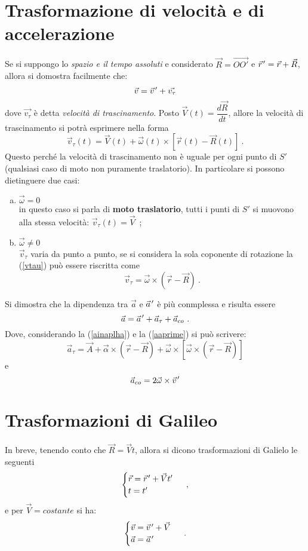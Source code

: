 \documentclass[12pt, oneside]{book}
\newcommand{\pvec}[1]{\vec{#1}\mkern2mu\vphantom{#1}}
\begin{document}
\section{Trasformazione di velocità e di accelerazione}
Se si suppongo lo \emph{spazio e il tempo assoluti} e considerato $\vec{R}=\overrightarrow{OO'}$ e $\pvec{r}'=\vec{r}+\vec{R}$, allora si domostra facilmente che:
\[\vec{v}=\pvec{v}'+\vec{v_\tau}\]
dove $\vec{v_\tau}$ è detta \emph{velocità di trascinamento}.
Posto $\vec{V}(t)=\dfrac{d\vec{R}}{dt}$, allore la velocità di trascinamento si potrà esprimere nella forma
\begin{equation}
\label{vtau}
\vec{v}_\tau(t)=\vec{V}(t)+\vec{\omega}(t)\times[\vec{r}(t)-\vec{R}(t)]~.
\end{equation}
Questo perché la velocità di trascinamento non è uguale per ogni punto di $S'$ (qualsiasi caso di moto non puramente traslatorio). In particolare si possono dietinguere due casi:
\begin{enumerate}[a)]
	\item $\vec{\omega}=0$\\
	in questo caso si parla di \textbf{moto traslatorio}, tutti i punti di $S'$ si muovono alla stessa velocità: $\vec{v}_\tau(t)=\vec{V}$~;
	\item $\vec{\omega}\neq 0$\\
	$\vec{v}_\tau$ varia da punto a punto, se si considera la sola coponente di rotazione la (\ref{vtau}) può essere riscritta come
	\[\vec{v}_\tau=\vec{\omega}\times(\vec{r}-\vec{R})~.\]
\end{enumerate}
Si dimostra che la dipendenza tra $\vec{a}$ e $\pvec{a}'$ è più conmplessa e risulta essere
\begin{equation}
\label{aaprime}
\vec{a}=\pvec{a}' + \vec{a}_\tau + \vec{a}_{co}~.
\end{equation}
Dove, considerando la (\ref{ainaplha}) e la (\ref{aaprime}) si può scrivere:
\[\vec a_\tau=\vec A+\vec \alpha \times(\vec{r}-\vec{R})+\vec{\omega}\times[\vec{\omega}\times (\vec{r}-\vec{R})]\]
e
\[\vec{a}_{co}=2\vec{\omega}\times\pvec v'\]
\section{Trasformazioni di Galileo}
In breve, tenendo conto che $\vec R = \vec V t$, allora si dicono trasformazioni di Galielo le seguenti
\begin{align*}
	\begin{cases}
		\vec r = \pvec r' + \vec V t'\\
		t=t'
	\end{cases}~,
\end{align*}
e per $\vec V = costante$ si ha:
\begin{align*}
	\begin{cases}
		\vec v = \pvec v' + \vec V\\
		\vec a = \pvec a'
	\end{cases}~.
\end{align*}
\end{document}
